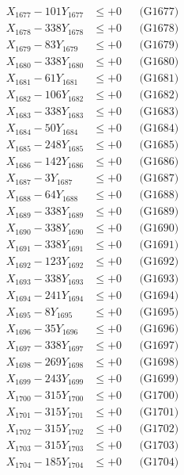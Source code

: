 \documentclass[a4paper,10pt]{article}
\begin{document}
{\begin{align}
X_{1677} - 101Y_{1677} &\leq +0 && \text{(G1677)} \\
X_{1678} - 338Y_{1678} &\leq +0 && \text{(G1678)} \\
X_{1679} - 83Y_{1679} &\leq +0 && \text{(G1679)} \\
X_{1680} - 338Y_{1680} &\leq +0 && \text{(G1680)} \\
\allowbreak
X_{1681} - 61Y_{1681} &\leq +0 && \text{(G1681)} \\
X_{1682} - 106Y_{1682} &\leq +0 && \text{(G1682)} \\
X_{1683} - 338Y_{1683} &\leq +0 && \text{(G1683)} \\
X_{1684} - 50Y_{1684} &\leq +0 && \text{(G1684)} \\
X_{1685} - 248Y_{1685} &\leq +0 && \text{(G1685)} \\
X_{1686} - 142Y_{1686} &\leq +0 && \text{(G1686)} \\
X_{1687} - 3Y_{1687} &\leq +0 && \text{(G1687)} \\
X_{1688} - 64Y_{1688} &\leq +0 && \text{(G1688)} \\
X_{1689} - 338Y_{1689} &\leq +0 && \text{(G1689)} \\
X_{1690} - 338Y_{1690} &\leq +0 && \text{(G1690)} \\
\allowbreak
X_{1691} - 338Y_{1691} &\leq +0 && \text{(G1691)} \\
X_{1692} - 123Y_{1692} &\leq +0 && \text{(G1692)} \\
X_{1693} - 338Y_{1693} &\leq +0 && \text{(G1693)} \\
X_{1694} - 241Y_{1694} &\leq +0 && \text{(G1694)} \\
X_{1695} - 8Y_{1695} &\leq +0 && \text{(G1695)} \\
X_{1696} - 35Y_{1696} &\leq +0 && \text{(G1696)} \\
X_{1697} - 338Y_{1697} &\leq +0 && \text{(G1697)} \\
X_{1698} - 269Y_{1698} &\leq +0 && \text{(G1698)} \\
X_{1699} - 243Y_{1699} &\leq +0 && \text{(G1699)} \\
X_{1700} - 315Y_{1700} &\leq +0 && \text{(G1700)} \\
\allowbreak
X_{1701} - 315Y_{1701} &\leq +0 && \text{(G1701)} \\
X_{1702} - 315Y_{1702} &\leq +0 && \text{(G1702)} \\
X_{1703} - 315Y_{1703} &\leq +0 && \text{(G1703)} \\
X_{1704} - 185Y_{1704} &\leq +0 && \text{(G1704)} \\

\end{align}}
\end{document}
